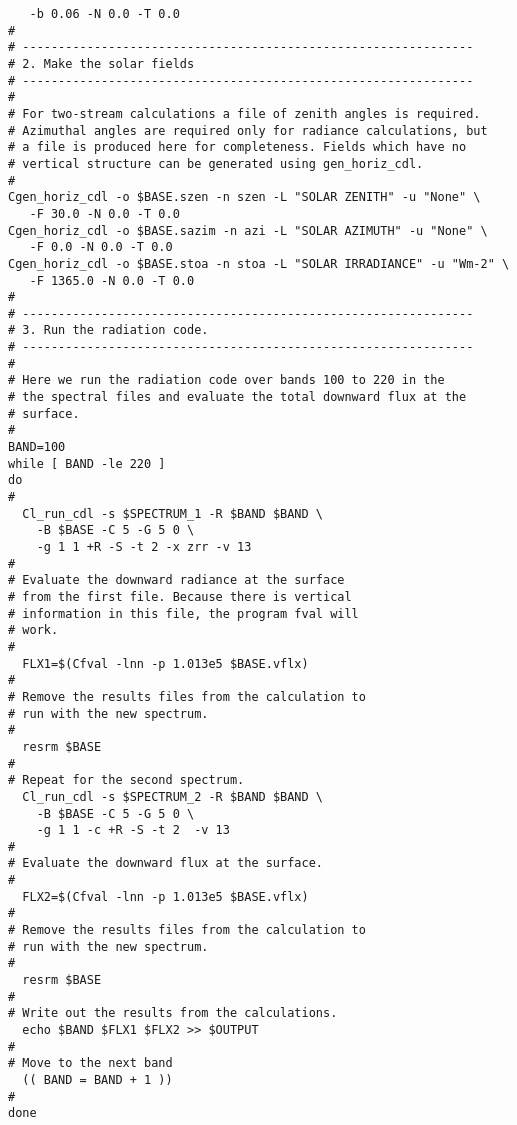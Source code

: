 {\begin{verbatim}
   -b 0.06 -N 0.0 -T 0.0
#
# ---------------------------------------------------------------
# 2. Make the solar fields
# ---------------------------------------------------------------
#
# For two-stream calculations a file of zenith angles is required.
# Azimuthal angles are required only for radiance calculations, but
# a file is produced here for completeness. Fields which have no
# vertical structure can be generated using gen_horiz_cdl.
#
Cgen_horiz_cdl -o $BASE.szen -n szen -L "SOLAR ZENITH" -u "None" \
   -F 30.0 -N 0.0 -T 0.0
Cgen_horiz_cdl -o $BASE.sazim -n azi -L "SOLAR AZIMUTH" -u "None" \
   -F 0.0 -N 0.0 -T 0.0
Cgen_horiz_cdl -o $BASE.stoa -n stoa -L "SOLAR IRRADIANCE" -u "Wm-2" \
   -F 1365.0 -N 0.0 -T 0.0
#
# ---------------------------------------------------------------
# 3. Run the radiation code.
# ---------------------------------------------------------------
#
# Here we run the radiation code over bands 100 to 220 in the
# the spectral files and evaluate the total downward flux at the
# surface.
#
BAND=100
while [ BAND -le 220 ]
do
#
  Cl_run_cdl -s $SPECTRUM_1 -R $BAND $BAND \
    -B $BASE -C 5 -G 5 0 \
    -g 1 1 +R -S -t 2 -x zrr -v 13
#
# Evaluate the downward radiance at the surface
# from the first file. Because there is vertical
# information in this file, the program fval will
# work.
#
  FLX1=$(Cfval -lnn -p 1.013e5 $BASE.vflx)
#
# Remove the results files from the calculation to
# run with the new spectrum.
#
  resrm $BASE
#
# Repeat for the second spectrum.
  Cl_run_cdl -s $SPECTRUM_2 -R $BAND $BAND \
    -B $BASE -C 5 -G 5 0 \
    -g 1 1 -c +R -S -t 2  -v 13
#
# Evaluate the downward flux at the surface.
#
  FLX2=$(Cfval -lnn -p 1.013e5 $BASE.vflx)
#
# Remove the results files from the calculation to
# run with the new spectrum.
#
  resrm $BASE
#
# Write out the results from the calculations.
  echo $BAND $FLX1 $FLX2 >> $OUTPUT
#
# Move to the next band
  (( BAND = BAND + 1 ))
#
done
\end{verbatim}
}
